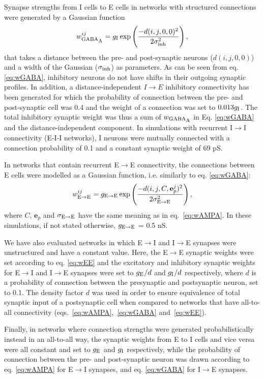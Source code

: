 \documentclass[a4paper,12pt]{article}
\newcommand{\ssc}[3]{\ensuremath{#1_{\text{#2}_{\text{#3}}}}}
\newcommand{\wEE     }{\ssc{w}      {\scriptsize{E}\ensuremath{\rightarrow}\scriptsize{E}}{}}
\newcommand{\wGABAA  }{\ssc{w}      {\scriptsize{GABA}}{\scriptsize{A}}}
\newcommand{\sigmasub}[1]{\ssc{\sigma}{\scriptsize{#1}}{}}
\newcommand{\gE      }{\ssc{g}      {\scriptsize{E}}{}}
\newcommand{\gI      }{\ssc{g}      {\scriptsize{I}}{}}
\newcommand{\gEE     }{\ssc{g}      {\scriptsize{E}\ensuremath{\rightarrow}\scriptsize{E}}{}}
\newcommand{\sigmaEE }{\ssc{\sigma} {\scriptsize{E}\ensuremath{\rightarrow}\scriptsize{E}}{}}
\newcommand{\dijce}{\ensuremath{d(i, j, C, \mathbf{e}_p^j)}}
\newcommand{\dijzz}{\ensuremath{d(i, j, 0, 0)}}
\begin{document}
Synapse strengths from I cells to E cells in networks with structured connections were generated by a Gaussian function
\begin{equation}
    \wGABAA^{ij} = \gI \exp\left(\frac{-d(i, j, 0, 0)^2}{2 \sigmasub{inh}^2}\right),
    \label{eq:wGABA}
\end{equation}
that takes a distance between the pre- and post-synaptic neurons (\dijzz) and a
width of the Gaussian (\sigmasub{inh}) as parameters. As can be seen from eq.
\eqref{eq:wGABA}, inhibitory neurons do not have shifts in their outgoing
synaptic profiles. In addition, a distance-independent $I \rightarrow E$
inhibitory connectivity has been generated for which the probability of connection
between the pre- and post-synaptic cell was 0.4 and the weight of a connection
was set to $0.013\gI$. The total inhibitory synaptic weight was thus a sum of
$\wGABAA$ in Eq. \eqref{eq:wGABA} and the distance-independent component. In
simulations with recurrent I$\rightarrow$I connectivity (E-I-I networks), I
neurons were mutually connected with a connection probability of 0.1 and a
constant synaptic weight of 69 pS.

In networks that contain recurrent E$\rightarrow$E connectivity, the
connections between E cells were modelled as a Gaussian function, i.e.
similarly to eq. \eqref{eq:wGABA}:
\begin{equation}
    \wEE^{ij} = \gEE \exp\left(\frac{-\dijce^2}{2 \sigmaEE^2}\right),
    \label{eq:wEE}
\end{equation}
where $C$, $\mathbf{e}_p$ and $\sigmaEE$ have the same meaning as in
eq.~\eqref{eq:wAMPA}. In these simulations, if not stated otherwise, $\gEE$ =
0.5 nS.

We have also evaluated networks in which E$\rightarrow$I and I$\rightarrow$E
synapses were unstructured and have a constant value. Here, the E$\rightarrow$E
synaptic weights were set according to eq. \eqref{eq:wEE} and the excitatory
and inhibitory synaptic weights for E$\rightarrow$I and I$\rightarrow$E
synapses were set to $\gE / d$ and $\gI / d$ respectively, where $d$ is a
probability of connection between the presynaptic and postsynaptic neuron, set
to 0.1. The density factor $d$ was used in order to ensure equivalence of total
synaptic input of a postsynaptic cell when compared to networks that have
all-to-all connectivity (eqs.~\ref{eq:wAMPA},~\ref{eq:wGABA} and~\ref{eq:wEE}).

Finally, in networks where connection strengths were generated
probabilistically instead in an all-to-all way, the synaptic weights from E to
I cells and vice versa were all constant and set to $\gE$ and $\gI$
respectively, while the probability of connection between the pre- and
post-synaptic neuron was drawn according to
eq. \eqref{eq:wAMPA} for E$\rightarrow$I synapses, and eq. \eqref{eq:wGABA} for
I$\rightarrow$E synapses.
\end{document}
